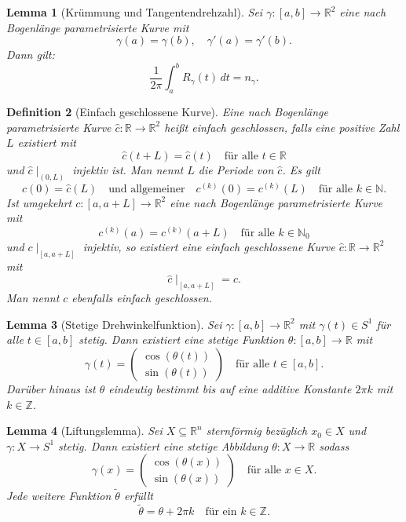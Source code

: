 \documentclass[a4paper,12pt]{article}
\theoremstyle{break}
\newtheorem{definition}{Definition}[section]
\newtheorem{lemma}[definition]{Lemma}
\begin{document}
\begin{lemma}[Krümmung und Tangentendrehzahl]
Sei \( \gamma: [a,b] \to \mathbb{R}^2 \) eine nach Bogenlänge parametrisierte Kurve mit  
\[
\gamma(a) = \gamma(b), \quad \gamma'(a) = \gamma'(b).
\]
Dann gilt:  
\[
\frac{1}{2\pi} \int_a^b R_{\gamma}(t) \, dt = n_{\gamma}.
\]
\end{lemma}

\begin{definition}[Einfach geschlossene Kurve]
Eine nach Bogenlänge parametrisierte Kurve \( \hat{c}: \mathbb{R} \to \mathbb{R}^2 \) heißt \emph{einfach geschlossen},  
falls eine positive Zahl \( L \) existiert mit  
\[
\hat{c}(t + L) = \hat{c}(t) \quad \text{für alle } t \in \mathbb{R}
\]
und \( \hat{c} \mid_{(0,L)} \) injektiv ist.  
Man nennt \( L \) die \emph{Periode} von \( \hat{c} \). Es gilt  
\[
c(0) = \hat{c}(L) \quad \text{und allgemeiner} \quad c^{(k)}(0) = c^{(k)}(L) \quad \text{für alle } k \in \mathbb{N}.
\]
Ist umgekehrt \( c: [a,a+L] \to \mathbb{R}^2 \) eine nach Bogenlänge parametrisierte Kurve mit  
\[
c^{(k)}(a) = c^{(k)}(a+L) \quad \text{für alle } k \in \mathbb{N}_0
\]
und \( c \mid_{[a,a+L]} \) injektiv, so existiert eine einfach geschlossene Kurve \( \hat{c}: \mathbb{R} \to \mathbb{R}^2 \) mit  
\[
\hat{c} \mid_{[a,a+L]} = c.
\]
Man nennt \( c \) ebenfalls einfach geschlossen.
\end{definition}

\begin{lemma}[Stetige Drehwinkelfunktion]
Sei \( \gamma: [a,b] \to \mathbb{R}^2 \) mit \( \gamma(t) \in S^1 \) für alle \( t \in [a,b] \) stetig.  
Dann existiert eine stetige Funktion \( \theta: [a,b] \to \mathbb{R} \) mit  
\[
\gamma(t) = \begin{pmatrix} \cos(\theta(t)) \\ \sin(\theta(t)) \end{pmatrix}
\quad \text{für alle } t \in [a,b].
\]
Darüber hinaus ist \( \theta \) eindeutig bestimmt bis auf eine additive Konstante \( 2\pi k \) mit \( k \in \mathbb{Z} \).
\end{lemma}

\begin{lemma}[Liftungslemma]
Sei \( X \subseteq \mathbb{R}^n \) sternförmig bezüglich \( x_0 \in X \) und \( \gamma: X \to S^1 \) stetig.  
Dann existiert eine stetige Abbildung \( \theta: X \to \mathbb{R} \) sodass  
\[
\gamma(x) = \begin{pmatrix} \cos(\theta(x)) \\ \sin(\theta(x)) \end{pmatrix}
\quad \text{für alle } x \in X.
\]
Jede weitere Funktion \( \tilde{\theta} \) erfüllt  
\[
\tilde{\theta} = \theta + 2\pi k \quad \text{für ein } k \in \mathbb{Z}.
\]
\end{lemma}
\end{document}
